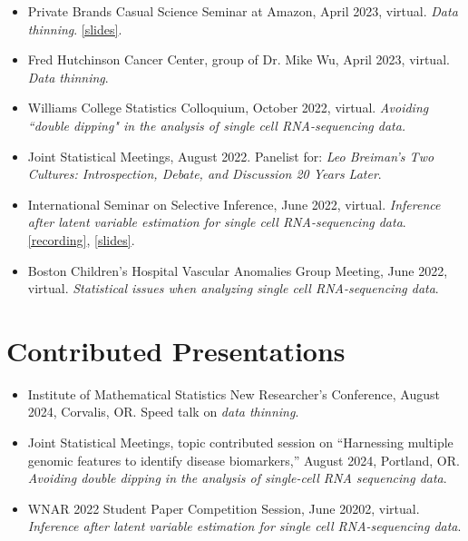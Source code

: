 \documentclass[margin, 10pt]{res}
\begin{document}
\begin{resume}
\begin{itemize}
\item Private Brands Casual Science Seminar at Amazon, April 2023, virtual. \emph{Data thinning}. \href{https://anna-neufeld.github.io/slides/amazon.pdf}{[slides]}. 
\item Fred Hutchinson Cancer Center, group of Dr. Mike Wu, April 2023, virtual. \emph{Data thinning}. 
\item Williams College Statistics Colloquium, October 2022, virtual. \emph{Avoiding ``double dipping" in the analysis of single cell RNA-sequencing data.} 
\item Joint Statistical Meetings, August 2022. Panelist for: \emph{Leo Breiman's Two Cultures: Introspection, Debate, and Discussion 20 Years Later}. 
\item International Seminar on Selective Inference, June 2022, virtual. \emph{Inference after latent variable estimation for single cell RNA-sequencing data}. \href{https://drive.google.com/file/d/1U4s7xiuz5yOCeDL2hjfIPZPbD7EsmINb/view}{[recording]}, \href{https://drive.google.com/file/d/1KPX8TkT85jHYalxhieyy65PAj18PRbFF/view}{[slides]}.
\item Boston Children's Hospital Vascular Anomalies Group Meeting, June 2022, virtual. \emph{Statistical issues when analyzing single cell RNA-sequencing data}. 
\end{itemize}
\section{Contributed Presentations} 
\begin{itemize}
\item Institute of Mathematical Statistics New Researcher's Conference, August 2024, Corvalis, OR. Speed talk on \emph{data thinning}.
\item Joint Statistical Meetings, topic contributed session on ``Harnessing multiple genomic features to identify disease biomarkers,” August 2024, Portland, OR.  \emph{Avoiding double dipping in the analysis of single-cell RNA sequencing data}. 
\item WNAR 2022 Student Paper Competition Session, June 20202, virtual. \emph{Inference after latent variable estimation for single cell RNA-sequencing data}.
\end{itemize}


\end{resume}
\end{document}
